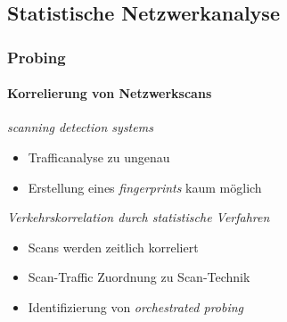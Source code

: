 
\subsection{Statistische Netzwerkanalyse}
\begin{frame}
\frametitle{Probing}
\framesubtitle{Korrelierung von Netzwerkscans}

\begin{alertblock}{\textit{scanning detection systems}}
    \begin{itemize}
        \item Trafficanalyse zu ungenau
        \item Erstellung eines \textit{fingerprints} kaum möglich
    \end{itemize}
\end{alertblock}
\vspace{0.6cm}
\begin{exampleblock}{\textit{Verkehrskorrelation durch statistische Verfahren}}
    \begin{itemize}
        \item Scans werden zeitlich korreliert
        \item Scan-Traffic Zuordnung zu Scan-Technik
        \item Identifizierung von \textit{orchestrated probing}
    \end{itemize}
\end{exampleblock}

\end{frame}

